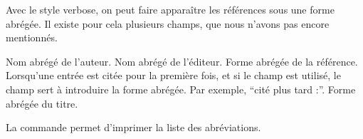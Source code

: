 Avec le style verbose, on peut faire apparaître les références sous une forme abrégée. Il existe pour cela plusieurs champs, que nous n'avons pas encore mentionnés.

\begin{fieldlist}
     Nom abrégé de l'auteur.
     Nom abrégé de l'éditeur.
     Forme abrégée de la référence.
     Lorsqu'une entrée est citée pour la première fois, et si le champ  est utilisé, le champ  sert à introduire la forme abrégée. Par exemple, \enquote{cité plus tard :}.
     Forme abrégée du titre.
\end{fieldlist}

La commande  permet d'imprimer la liste des abréviations.

\bibverbosetrad
